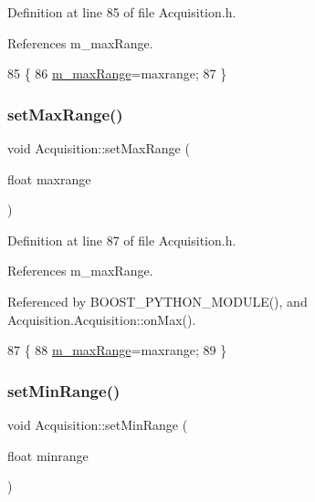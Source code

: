 Definition at line 85 of file Acquisition.\+h.



References m\+\_\+max\+Range.


\begin{DoxyCode}
85                                   \{
86     \hyperlink{classAcquisition_a45478629e9db582470b4b158edb46616}{m\_maxRange}=maxrange;
87   \}
\end{DoxyCode}
\mbox{\label{classAcquisition_a786da6cff5428020034be23e554e0e1b}} 
\subsubsection{\texorpdfstring{set\+Max\+Range()}{setMaxRange()}\hspace{0.1cm}{\footnotesize\ttfamily [2/2]}}
{\footnotesize\ttfamily void Acquisition\+::set\+Max\+Range (\begin{DoxyParamCaption}\item[{float}]{maxrange }\end{DoxyParamCaption})\hspace{0.3cm}{\ttfamily [inline]}}



Definition at line 87 of file Acquisition.\+h.



References m\+\_\+max\+Range.



Referenced by B\+O\+O\+S\+T\+\_\+\+P\+Y\+T\+H\+O\+N\+\_\+\+M\+O\+D\+U\+L\+E(), and Acquisition.\+Acquisition\+::on\+Max().


\begin{DoxyCode}
87                                   \{
88     \hyperlink{classAcquisition_a45478629e9db582470b4b158edb46616}{m\_maxRange}=maxrange;
89   \}
\end{DoxyCode}
\mbox{\label{classAcquisition_a8a15ffc6e539a3ae12efe4bea1ca7587}} 
\subsubsection{\texorpdfstring{set\+Min\+Range()}{setMinRange()}\hspace{0.1cm}{\footnotesize\ttfamily [1/2]}}
{\footnotesize\ttfamily void Acquisition\+::set\+Min\+Range (\begin{DoxyParamCaption}\item[{float}]{minrange }\end{DoxyParamCaption})\hspace{0.3cm}{\ttfamily [inline]}}



